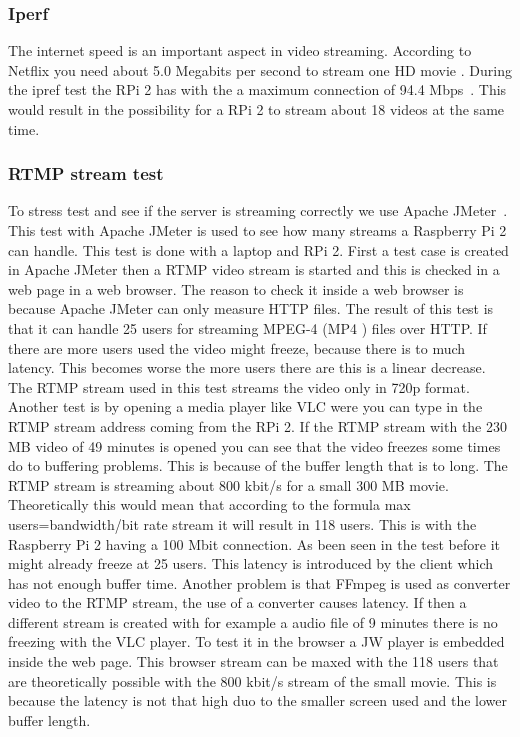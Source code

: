 \documentclass{sig-alternate-br}
\begin{document}
\subsubsection{Iperf}

The internet speed is an important aspect in video streaming. According to Netflix you need about 5.0 Megabits per second to stream one HD movie \cite{netflix}. During the ipref test the RPi 2 has with the a maximum connection of  94.4 Mbps~\cite{ipref}. This would result in the possibility for a RPi 2 to stream about 18 videos at the same time. 

\subsubsection{RTMP stream test}

To stress test and see if the server is streaming correctly we use Apache JMeter~\cite{jmeter}. This test with Apache JMeter is used to see how many streams a Raspberry Pi 2 can handle. This test is done with a laptop and RPi 2. First a test case is created in Apache JMeter then a RTMP video stream is started and this is checked in a web page in a web browser. The reason to check it inside a web browser is because Apache JMeter can only measure HTTP files. The result of this test is that it can handle 25 users for streaming MPEG-4 (MP4 ) files over HTTP. If there are more users used the video might freeze, because there is to much latency. This becomes worse the more users there are this is a linear decrease. The RTMP stream used in this test streams the video only in 720p format. \newline Another test is by opening a media player like VLC were you can type in the RTMP stream address coming from the RPi 2. If the RTMP stream with the 230 MB video of 49 minutes is opened you can see that the video freezes some times do to buffering problems. This is because of the buffer length that is to long.  \newline
The RTMP stream is streaming about 800 kbit/s for a small 300 MB movie. Theoretically this would mean that according to the formula max users=bandwidth/bit rate stream it will result in 118 users. This is with the Raspberry Pi 2 having a 100 Mbit connection. As been seen in the test before it might already freeze at 25 users. This latency is introduced by the client which has not enough buffer time. Another problem is that FFmpeg is used as converter video to the RTMP stream, the use of a converter causes latency. \newline
If then a different stream is created with for example a audio file of 9 minutes there is no freezing with the VLC player. \newline To test it in the browser a JW player is embedded inside the web page. This browser stream can be maxed with the 118 users that are theoretically possible with the 800 kbit/s stream of the small movie. This is because the latency is not that high duo to the smaller screen used and the lower buffer length.
 
\end{document}
